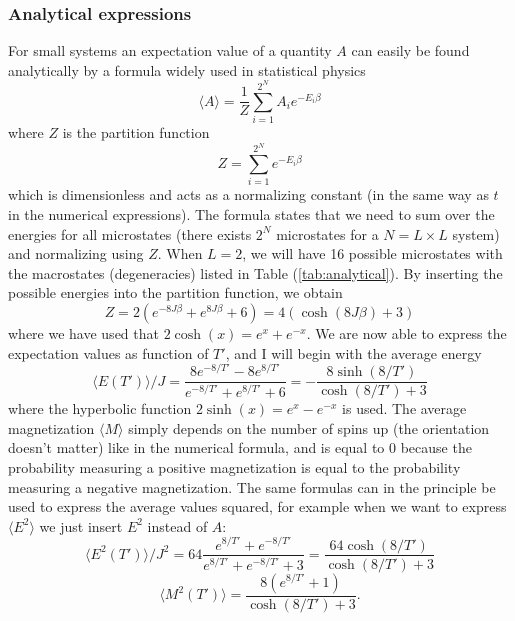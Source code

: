 \documentclass[norsk,a4paper,12pt]{article}
\begin{document}
\subsubsection{Analytical expressions}
For small systems an expectation value of a quantity $A$ can easily be found analytically by a formula widely used in statistical physics
\begin{equation}
\langle A\rangle = \frac{1}{Z}\sum_{i=1}^{2^N}A_ie^{-E_i\beta}
\end{equation}
where $Z$ is the partition function
\begin{equation}
Z=\sum_{i=1}^{2^N}e^{-E_i\beta}
\end{equation}
which is dimensionless and acts as a normalizing constant (in the same way as $t$ in the numerical expressions). The formula states that we need to sum over the energies for all microstates (there exists $2^N$ microstates for a $N=L\times L$ system) and normalizing using $Z$. When $L=2$, we will have 16 possible microstates with the macrostates (degeneracies) listed in Table (\ref{tab:analytical}). By inserting the possible energies into the partition function, we obtain
\begin{equation}
Z=2(e^{-8J\beta}+e^{8J\beta}+6)=4(\cosh(8J\beta)+3)
\end{equation}
where we have used that $2\cosh(x)=e^x+e^{-x}$. We are now able to express the expectation values as function of $T'$, and I will begin with the average energy
\begin{equation}
\langle E(T')\rangle/J = \frac{8e^{-8/T'}-8e^{8/T'}}{e^{-8/T'}+e^{8/T'}+6}= -\frac{8\sinh(8/T')}{\cosh(8/T')+3}
\end{equation}
where the hyperbolic function $2\sinh(x)=e^x-e^{-x}$ is used. The average magnetization $\langle M\rangle$ simply depends on the number of spins up (the orientation doesn't matter) like in the numerical formula, and is equal to 0 because the probability measuring a positive magnetization is equal to the probability measuring a negative magnetization. The same formulas can in the principle be used to express the average values squared, for example when we want to express $\langle E^2\rangle$ we just insert $E^2$ instead of $A$:
\begin{equation}
\langle E^2(T')\rangle/J^2=64\frac{e^{8/T'}+e^{-8/T'}}{e^{8/T'}+e^{-8/T'}+3}=\frac{64\cosh(8/T')}{\cosh(8/T')+3}
\end{equation}
\begin{equation}
\langle M^2(T')\rangle=\frac{8(e^{8/T'}+1)}{\cosh(8/T')+3}.
\end{equation}
\end{document}
